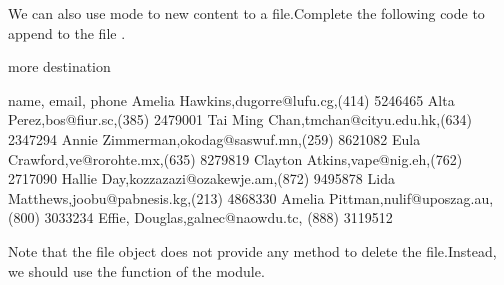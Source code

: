 \documentclass[letterpaper,10pt,english]{sphinxmanual}
\begin{document}
 We can also use  mode to  new content to a file.Complete the following code to append  to the file .

\begin{sphinxVerbatim}[commandchars=\\\{\}]
  
    
more destination
\end{sphinxVerbatim}

\begin{sphinxVerbatim}[commandchars=\\\{\}]
name, email, phone
Amelia Hawkins,dugorre@lufu.cg,(414) 524\PYGZhy{}6465
Alta Perez,bos@fiur.sc,(385) 247\PYGZhy{}9001
Tai Ming Chan,tmchan@cityu.edu.hk,(634) 234\PYGZhy{}7294
Annie Zimmerman,okodag@saswuf.mn,(259) 862\PYGZhy{}1082
Eula Crawford,ve@rorohte.mx,(635) 827\PYGZhy{}9819
Clayton Atkins,vape@nig.eh,(762) 271\PYGZhy{}7090
Hallie Day,kozzazazi@ozakewje.am,(872) 949\PYGZhy{}5878
Lida Matthews,joobu@pabnesis.kg,(213) 486\PYGZhy{}8330
Amelia Pittman,nulif@uposzag.au,(800) 303\PYGZhy{}3234
Effie, Douglas,galnec@naowdu.tc, (888) 311\PYGZhy{}9512
\end{sphinxVerbatim}


Note that the file object does not provide any method to delete the file.Instead, we should use the function  of the  module.

\begin{sphinxVerbatim}[commandchars=\\\{\}]
 
\end{sphinxVerbatim}
\end{document}

